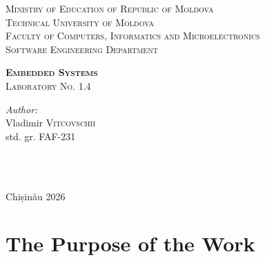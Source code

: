 \documentclass[12pt]{article}
\begin{document}
\begin{titlepage}
   \begin{center}
    \textsc{\large Ministry of Education of Republic of Moldova}\\[0.5cm]
    \textsc{\large Technical University of Moldova}\\[0.5cm]
    \textsc{\large Faculty of Computers, Informatics and Microelectronics}\\[0.5cm]
    \textsc{\large Software Engineering Department}\\[1.2cm]

    \vspace{25mm}

    {\LARGE \textbf{\textsc{Embedded Systems}}}\\[0.5cm]
    \textsc{\large Laboratory No. 1.4}\\[0.5cm]

    \newcommand{\HRule}{\rule{\linewidth}{0.5mm}}
    \vspace{80mm}

    \begin{minipage}[t]{0.4\textwidth}
    \begin{flushleft} \large
    \emph{Author:} \\
    Vladimir \textsc{Vitcovschii}\\
    std. gr. FAF-231
    \end{flushleft}
    \end{minipage}
    ~
    \begin{minipage}[t]{0.4\textwidth}
    \begin{flushright} \large
    \end{flushright}
    \end{minipage}\\[3cm]

    \vspace{5mm}
    \large Chișinău 2026\\[0.5cm]

    \vfill
    \end{center}
\end{titlepage}

\clearpage
\tableofcontents
\clearpage

\setcounter{page}{2}
\pagestyle{fancy}
\fancyhf{}
\rhead{\thepage}

\section{The Purpose of the Work}
\end{document}

